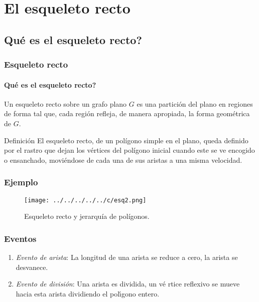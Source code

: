 \documentclass[notes=show]{beamer}
\begin{document}
\section{El esqueleto recto}

\subsection{\textquestiondown Qu\'e es el esqueleto recto?}

\begin{frame}
\frametitle{Esqueleto recto}
\framesubtitle{\textquestiondown Qu\'e es el esqueleto recto?	}
\begin{block}{}
Un esqueleto recto sobre un grafo plano $G$ es una partici\'on del plano en regiones de forma tal que, cada regi\'on refleja, de manera apropiada, la forma geom\'etrica de $G$.
\end{block}
\pause
\begin{block}{Definici\'on}
El \alert{esqueleto recto}, de un pol\'igono simple en el plano, queda definido por el rastro que
dejan los v\'ertices del pol\'igono inicial cuando este se ve encogido o ensanchado, movi\'endose
de cada una de sus aristas a una misma velocidad.
\end{block}
\end{frame}

\begin{frame}
\frametitle{Ejemplo}
\begin{figure}[htbp]
	\centering
		\texttt{[image: ../../../../../c/esq2.png]}%
	\caption{Esqueleto recto y jerarqu\'ia de pol\'igonos.}
\end{figure}
\transboxin[duration=0.4]
\end{frame}

\begin{frame}
\frametitle{Eventos}
	\begin{enumerate}
		\item<1-> \emph{\alert{Evento de arista}}: La longitud de una arista se reduce a
cero, la arista se desvanece.
		\item<2-> \emph{\alert{Evento de divisi\'on}}: Una arista es dividida, un v\'{e}%
rtice reflexivo se mueve hacia esta arista dividiendo el pol\'{\i}gono entero.
	\end{enumerate}%
\end{frame}

\begin{frame}
\end{frame}
\end{document}
